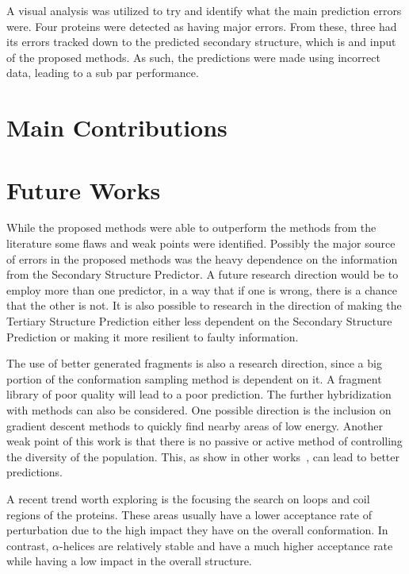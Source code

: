 A visual analysis was utilized to try and identify what the main prediction
errors were. Four proteins were detected as having major errors. From these,
three had its errors tracked down to the predicted secondary structure, which is
and input of the proposed methods. As such, the predictions were made using
incorrect data, leading to a sub par performance.

\section{Main Contributions} \label{sec:main-contributions}

\section{Future Works}\label{sec:future_works}

While the proposed methods were able to outperform the methods from the
literature some flaws and weak points were identified. Possibly the major
source of errors in the proposed methods was the heavy dependence on the
information from the Secondary Structure Predictor. A future research direction
would be to employ more than one predictor, in a way that if one is wrong,
there is a chance that the other is not. It is also possible to research in the
direction of making the Tertiary Structure Prediction either less dependent on
the Secondary Structure Prediction or making it more resilient to faulty
information.

The use of better generated fragments is also a research direction, since a big
portion of the conformation sampling method is dependent on it. A fragment
library of poor quality will lead to a poor prediction.
The further hybridization with methods can also be considered.  One possible
direction is the inclusion on gradient descent methods to quickly find nearby
areas of low energy.
Another weak point of this work is that there is no passive or active method of
controlling the diversity of the population. This, as show in other
works~\cite{narloch2016diversification,simoncini2017balancing}, can lead to
better predictions.

A recent trend worth exploring is the focusing the search on loops and coil
regions of the proteins. These areas usually have a lower acceptance rate of
perturbation due to the high impact they have on the overall conformation.  In
contrast, $\alpha$-helices are relatively stable and have a much higher
acceptance rate while having a low impact in the overall structure.

